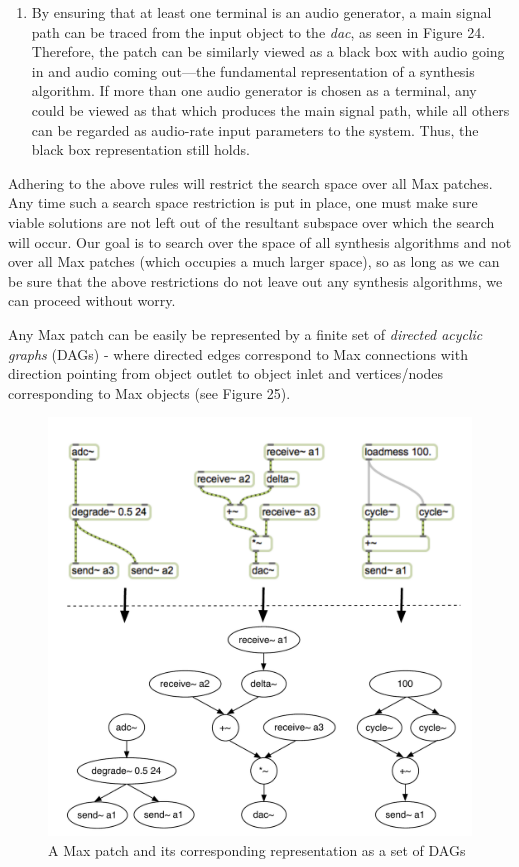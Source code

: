 \documentclass[12pt]{report} 	%
\numberwithin{figure}{chapter}
\numberwithin{table}{chapter}
\numberwithin{equation}{chapter}
\begin{document}
\begin{flushleft}
\begin{enumerate}
\item By ensuring that at least one terminal is an audio generator, a main signal path can be traced from the input object to the \textit{dac\texttildelow{}}, as seen in Figure 24. Therefore, the patch can be similarly viewed as a black box with audio going in and audio coming out---the fundamental representation of a synthesis algorithm. If more than one audio generator is chosen as a terminal, any could be viewed as that which produces the main signal path, while all others can be regarded as audio-rate input parameters to the system. Thus, the black box representation still holds.
\end{enumerate}

Adhering to the above rules will restrict the search space over all Max patches. Any time such a search space restriction is put in place, one must make sure viable solutions are not left out of the resultant subspace over which the search will occur. Our goal is to search over the space of all synthesis algorithms and not over all Max patches (which occupies a much larger space), so as long as we can be sure that the above restrictions do not leave out any synthesis algorithms, we can proceed without worry.

Any Max patch can be easily be represented by a finite set of \textit{directed acyclic graphs} (DAGs) - where directed edges correspond to Max connections with direction pointing from object outlet to object inlet and vertices/nodes corresponding to Max objects (see Figure 25).
\begin{figure}[h!]
\begin{center}
\includegraphics[scale=0.7]{MaxDAGs}
\caption[A Max patch as a set of DAGs]{A Max patch and its corresponding representation as a set of DAGs}
\end{center}
\vspace{12pt}
\end{figure}


\end{flushleft}
\end{document}
